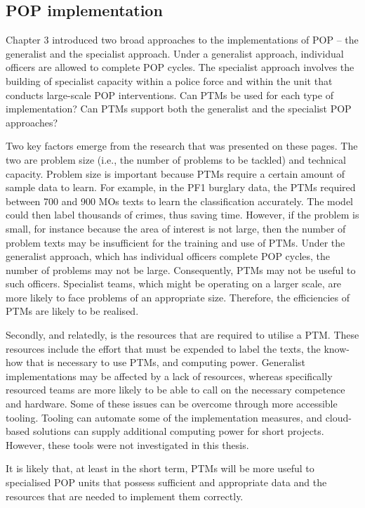 \subsection{POP implementation} Chapter 3 introduced two broad approaches to the implementations of POP – the generalist and the specialist approach. Under a generalist approach, individual officers are allowed to complete POP cycles. The specialist approach involves the building of specialist capacity within a police force and within the unit that conducts large-scale POP interventions. Can PTMs be used for each type of implementation? Can PTMs support both the generalist and the specialist POP approaches?

Two key factors emerge from the research that was presented on these pages. The two are problem size (i.e., the number of problems to be tackled) and technical capacity. Problem size is important because PTMs require a certain amount of sample data to learn. For example, in the PF1 burglary data, the PTMs required between 700 and 900 MOs texts to learn the classification accurately. The model could then label thousands of crimes, thus saving time. However, if the problem is small, for instance because the area of interest is not large, then the number of problem texts may be insufficient for the training and use of PTMs. Under the generalist approach, which has individual officers complete POP cycles, the number of problems may not be large. Consequently, PTMs may not be useful to such officers. Specialist teams, which might be operating on a larger scale, are more likely to face problems of an appropriate size. Therefore, the efficiencies of PTMs are likely to be realised.

Secondly, and relatedly, is the resources that are required to utilise a PTM. These resources include the effort that must be expended to label the texts, the know-how that is necessary to use PTMs, and computing power. Generalist implementations may be affected by a lack of resources, whereas specifically resourced teams are more likely to be able to call on the necessary competence and hardware. Some of these issues can be overcome through more accessible tooling. Tooling can automate some of the implementation measures, and cloud-based solutions can supply additional computing power for short projects. However, these tools were not investigated in this thesis.

It is likely that, at least in the short term, PTMs will be more useful to specialised POP units that possess sufficient and appropriate data and the resources that are needed to implement them correctly.

